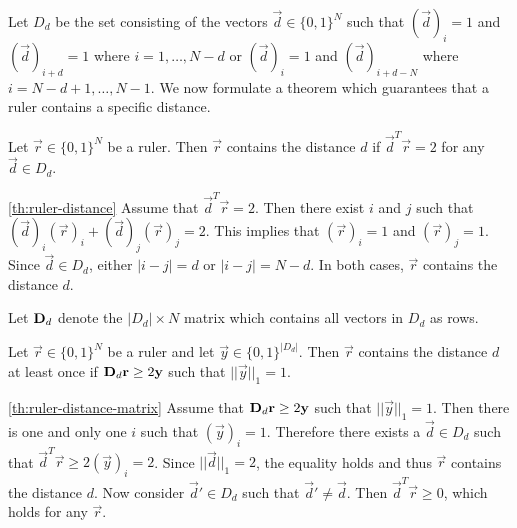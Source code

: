 \documentclass[a4paper, openany, oneside]{memoir}
\begin{document}
Let $D_d$ be the set consisting of the vectors $\vec{d} \in \{0,1\}^N$ such that $(\vec{d})_i=1$ and $(\vec{d})_{i+d}=1$ where $i = 1,\ldots,N-d$ or $(\vec{d})_i=1$ and $(\vec{d})_{i+d-N}$ where $i = N-d+1,\ldots,N-1$.
We now formulate a theorem which guarantees that a ruler contains a specific distance.

\begin{blockTheorem} \label{th:ruler-distance}\nolinebreak
    Let $\vec{r} \in \{0,1\}^N$ be a ruler. Then $\vec{r}$ contains the distance $d$ if $\vec{d}^T \vec{r} = 2$ for any $\vec{d} \in D_d$.\nolinebreak
\end{blockTheorem}

\begin{blockProofTheorem}{\ref{th:ruler-distance}}
    Assume that $\vec{d}^T\vec{r} = 2$. Then there exist $i$ and $j$ such that $(\vec{d})_i (\vec{r})_i + (\vec{d})_j (\vec{r})_j = 2$. This implies that $(\vec{r})_i = 1$ and $(\vec{r})_j = 1$. Since $\vec{d} \in D_d$, either $|i-j|=d$ or $|i-j| = N-d$. In both cases, $\vec{r}$ contains the distance $d$. 
\end{blockProofTheorem}

Let $\boldsymbol{\mathbf{D}}_d$ denote the $|D_d| \times N$ matrix which contains all vectors in $D_d$ as rows.

\begin{blockTheorem} \label{th:ruler-distance-matrix}\nolinebreak
    Let $\vec{r} \in \{0,1\}^N$ be a ruler and let $\vec{y} \in \{0,1\}^{|D_d|}$. Then $\vec{r}$ contains the distance $d$ at least once if $\boldsymbol{\mathbf{D}}_d \boldsymbol{\mathbf{r}} \ge 2\boldsymbol{\mathbf{y}}$ such that $||\vec{y}||_1 = 1$.
\end{blockTheorem}

\begin{blockProofTheorem}{\ref{th:ruler-distance-matrix}}
    Assume that $\boldsymbol{\mathbf{D}}_d \boldsymbol{\mathbf{r}} \ge 2 \boldsymbol{\mathbf{y}}$ such that $||\vec{y}||_1 = 1$. Then there is one and only one $i$ such that $(\vec{y})_i=1$. Therefore there exists a $\vec{d} \in D_d$ such that $\vec{d}^T \vec{r} \ge 2 (\vec{y})_i = 2$. Since $||\vec{d}||_1=2$, the equality holds and thus $\vec{r}$ contains the distance $d$. Now consider $\vec{d}' \in D_d$ such that $\vec{d}' \neq \vec{d}$. Then $\vec{d}^T \vec{r} \ge 0$, which holds for any $\vec{r}$.  
\end{blockProofTheorem}
\end{document}

